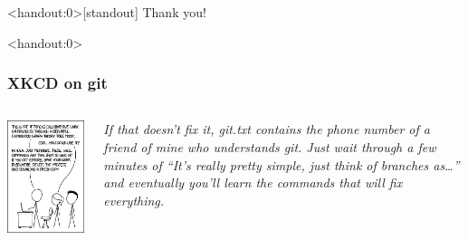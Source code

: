 \documentclass[10pt,svgnames]{beamer}
\begin{document}


\begin{frame}<handout:0>[standout]
Thank you!
\end{frame}


\appendix

\begin{frame}<handout:0>
\label{xkcd_git}
\frametitle{XKCD on git \hfill\hyperlink{git_cons}{}}

\begin{columns}[T,onlytextwidth]
\includegraphics[width=\textwidth]{figures/xkcd-git.png}

\vfill
\emph{If that doesn't fix it, git.txt contains the phone number of a friend of mine who understands git.
Just wait through a few minutes of “It's really pretty simple, just think of branches as\ldots” and eventually you'll learn the commands that will fix everything.
}
\end{columns}
\end{frame}
\end{document}
